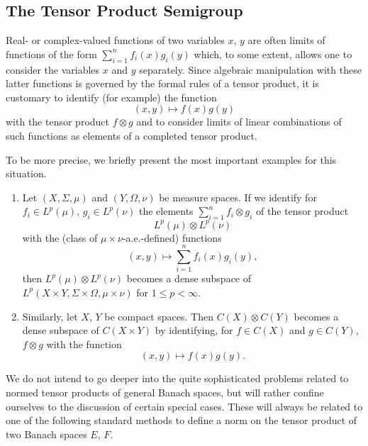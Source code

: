 \subsection{The Tensor Product Semigroup}\label{subsec:a1-3.8}%
Real- or complex-valued functions of two variables $x$, $y$ are often limits of functions of the form 
$\sum_{i=1}^{n} f_{i}(x)g_{i}(y)$ which, to some extent, allows one to consider the variables $x$ and $y$ separately.
Since algebraic manipulation with these latter functions is governed by the formal rules of a tensor product, it is customary to identify (for example) the function
\[
    (x,y) \mapsto f(x)g(y)
\]
with the tensor product $f \otimes g$ and to consider limits of linear combinations of such functions as elements of a completed tensor product.

To be more precise, we briefly present the most important examples for this situation.
\begin{examples*}\label{ex:a1-5.1}
\begin{enumerate}[\upshape(i), wide, labelindent=.25em]

\item
Let $(X,\Sigma,\mu)$ and $(Y,\Omega,\nu)$ be measure spaces. 
If we identify for $f_{i} \in L^{p}(\mu)$, $g_{i} \in L^{p}(\nu)$ the elements $\sum_{i=1}^{n} f_{i} \otimes g_{i}$ of the tensor product
\[
    L^{p}(\mu) \otimes L^{p}(\nu)
\]
with the (class of\/ $\mu \times \nu$-a.e.-defined) functions
\[
    (x,y) \mapsto \sum_{i=1}^{n} f_{i}(x)g_{i}(y) ,
\]
then $L^{p}(\mu) \otimes L^{p}(\nu)$ becomes a dense subspace of\/ $L^{p}(X\times Y,\Sigma\times\Omega,\mu\times\nu)$ for $1 \leq p < \infty$.

\item
Similarly, let $X$, $Y$ be compact spaces. Then $C(X) \otimes C(Y)$ becomes a dense subspace of\/ $C(X\times Y)$ by identifying, for $f \in C(X)$ and $g \in C(Y)$, $f \otimes g$ with the function
\[
    (x,y) \mapsto f(x)g(y) .
\]
\end{enumerate}
\end{examples*}
We do not intend to go deeper into the quite sophisticated problems related to normed tensor products of general Banach spaces, but will rather confine ourselves to the discussion of certain special cases.
These will always be related to one of the following standard methods to define a norm on the tensor product of two Banach spaces $E$, $F$.

